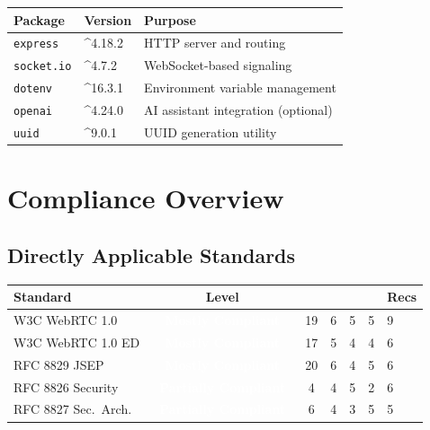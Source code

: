\documentclass[11pt,letterpaper]{article}
\newcommand{\mostlycompliant}{\colorbox{partial}{\textcolor{white}{\textbf{\small~Mostly Compliant~}}}}
\newcommand{\partiallycompliant}{\colorbox{noncompliant}{\textcolor{white}{\textbf{\small~Partially Compliant~}}}}
\begin{document}
\begin{center}
\begin{tabular}{lll}
\toprule
\textbf{Package} & \textbf{Version} & \textbf{Purpose} \\
\midrule
\texttt{express} & \^{}4.18.2 & HTTP server and routing \\
\texttt{socket.io} & \^{}4.7.2 & WebSocket-based signaling \\
\texttt{dotenv} & \^{}16.3.1 & Environment variable management \\
\texttt{openai} & \^{}4.24.0 & AI assistant integration (optional) \\
\texttt{uuid} & \^{}9.0.1 & UUID generation utility \\
\bottomrule
\end{tabular}
\end{center}

\newpage

\section{Compliance Overview}

\subsection{Directly Applicable Standards}

\begin{center}
\begin{tabularx}{\textwidth}{L{3.8cm}cccccX}
\toprule
\textbf{Standard} & \textbf{Level} &  &  &  &  & \textbf{Recs} \\
\midrule
W3C WebRTC 1.0 & \mostlycompliant & 19 & 6 & 5 & 5 & 9 \\
W3C WebRTC 1.0 ED & \mostlycompliant & 17 & 5 & 4 & 4 & 6 \\
RFC 8829 JSEP & \mostlycompliant & 20 & 6 & 4 & 5 & 6 \\
RFC 8826 Security & \partiallycompliant & 4 & 4 & 5 & 2 & 6 \\
RFC 8827 Sec.\ Arch. & \partiallycompliant & 6 & 4 & 3 & 5 & 5 \\
\bottomrule
\end{tabularx}
\end{center}
\end{document}
